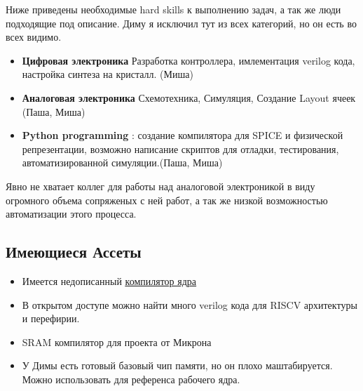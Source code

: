 \documentclass[a4paper,12pt]{article} %
\begin{document}
Ниже приведены необходимые  hard skills к выполнению задач, а так же люди подходящие под описание. Диму я исключил тут из всех категорий, но он есть во всех видимо.

\begin{itemize}
\item \textbf{Цифровая электроника} Разработка контроллера, имлементация verilog кода, настройка синтеза на кристалл. (Миша)
\item \textbf{Аналоговая электроника} Схемотехника, Симуляция, Создание Layout ячеек (Паша, Миша)
\item \textbf{Python programming} : создание компилятора для SPICE и физической репрезентации, возможно написание скриптов для отладки, тестирования, автоматизированной симуляции.(Паша, Миша)

\end{itemize}

Явно не хватает коллег для работы над аналоговой электроникой в виду огромного объема сопряженых с ней работ, а так же низкой возможностью автоматизации этого процесса.

\subsection{Имеющиеся Ассеты}

\begin{itemize}
\item Имеется недописанный \underline{\href{https://gitlab.com/mipt-ncs/nvram-gen}{компилятор ядра}}
\item В открытом доступе можно найти много verilog кода для RISCV архитектуры и перефирии.
\item SRAM компилятор для проекта от Микрона
\item У Димы есть готовый базовый чип памяти, но он плохо маштабируется. Можно использовать для референса  рабочего ядра. 


\end{itemize}
\end{document}
